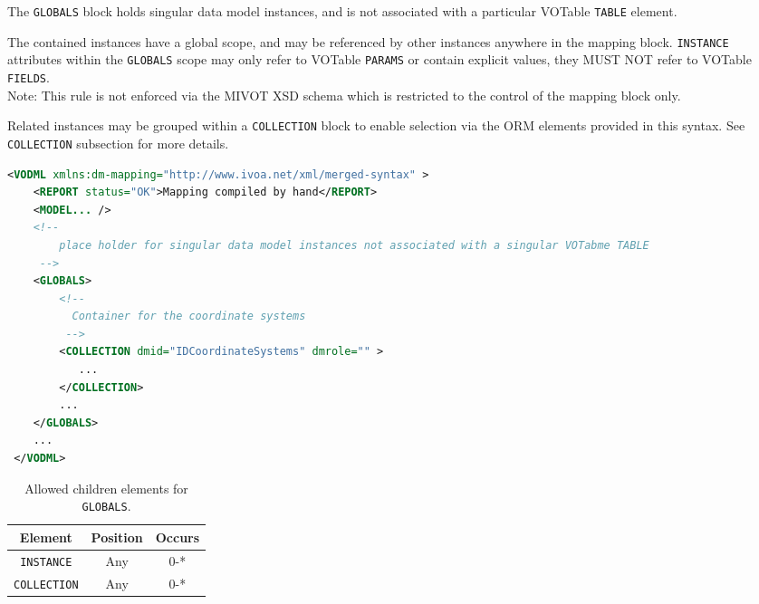 The \texttt{GLOBALS} block holds singular data model instances, and is not associated 
with a particular VOTable \texttt{TABLE} element.

The contained instances have a global scope, and may be
referenced by other instances anywhere in the mapping block.  \texttt{INSTANCE} attributes
within the \texttt{GLOBALS} scope may only refer to VOTable \texttt{PARAMS} or contain
explicit values, they MUST NOT refer to VOTable \texttt{FIELDS}.  \\ 
Note: This rule is not enforced via the MIVOT XSD schema which is restricted to the control of the mapping block only.

Related instances may be grouped within a \texttt{COLLECTION} block to enable selection
via the ORM elements provided in this syntax.  See \texttt{COLLECTION} subsection for more details.

\begin{lstlisting}[caption={Example \texttt{GLOBALS} block (see in \ref{GLOBALS_snippet}).},language=XML]
<VODML xmlns:dm-mapping="http://www.ivoa.net/xml/merged-syntax" >
    <REPORT status="OK">Mapping compiled by hand</REPORT>
    <MODEL... />
    <!--	             
        place holder for singular data model instances not associated with a singular VOTabme TABLE
     -->
    <GLOBALS>
        <!--
          Container for the coordinate systems
         -->
        <COLLECTION dmid="IDCoordinateSystems" dmrole="" >
           ...
        </COLLECTION>
        ...
    </GLOBALS>
    ...
 </VODML>
\end{lstlisting}


\begin{table}[!htbp]
  \small
  \centering
  \begin{tabulary}{\linewidth}{|c |c |c|}
    \hline 
        \textbf{Element} &
        \textbf{Position} &
        \textbf{Occurs}\\
    \hline
    \hline
        \texttt{INSTANCE} &
        Any &
        0-*\\
    \hline
        \texttt{COLLECTION} &
        Any &
        0-*\\
    \hline
  \end{tabulary}
  \caption{Allowed children elements for \texttt{GLOBALS}.} 
  \label{tbl:globals-children}
 \end{table}
